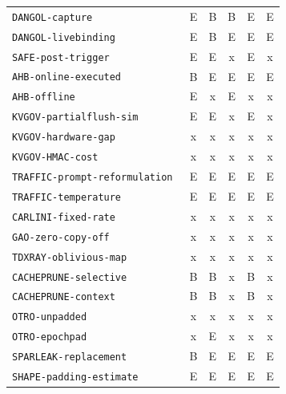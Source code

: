 \begin{table}[t]
\begin{tabularx}{\textwidth}{@{}Yccccc@{}}
\texttt{DANGOL-\allowbreak{}capture}~\cite{dangol2026workflow} & E & B & B & E & E\\
\texttt{DANGOL-\allowbreak{}livebinding}~\cite{dangol2026workflow} & E & B & E & E & E\\
\texttt{SAFE-\allowbreak{}post-\allowbreak{}trigger}~\cite{chu2025safekv} & E & E & x & E & x\\
\texttt{AHB-\allowbreak{}online-\allowbreak{}executed}~\cite{zhu2026turing} & B & E & E & E & E\\
\texttt{AHB-\allowbreak{}offline}~\cite{zhu2026turing} & E & x & E & x & x\\
\texttt{KVGOV-\allowbreak{}partialflush-\allowbreak{}sim}~\cite{addagada2026kvgov} & E & E & x & E & x\\
\texttt{KVGOV-\allowbreak{}hardware-\allowbreak{}gap}~\cite{addagada2026kvgov} & x & x & x & x & x\\
\texttt{KVGOV-\allowbreak{}HMAC-\allowbreak{}cost}~\cite{addagada2026kvgov} & x & x & x & x & x\\
\texttt{TRAFFIC-\allowbreak{}prompt-\allowbreak{}reformulation}~\cite{pouryousef2026traffic} & E & E & E & E & E\\
\texttt{TRAFFIC-\allowbreak{}temperature}~\cite{pouryousef2026traffic} & E & E & E & E & E\\
\texttt{CARLINI-\allowbreak{}fixed-\allowbreak{}rate}~\cite{carlini2024remote} & x & x & x & x & x\\
\texttt{GAO-\allowbreak{}zero-\allowbreak{}copy-\allowbreak{}off}~\cite{gao2025iknow} & x & x & x & x & x\\
\texttt{TDXRAY-\allowbreak{}oblivious-\allowbreak{}map}~\cite{hornetz2026tdxray} & x & x & x & x & x\\
\texttt{CACHEPRUNE-\allowbreak{}selective}~\cite{wu2026cacheprune} & B & B & x & B & x\\
\texttt{CACHEPRUNE-\allowbreak{}context}~\cite{wu2026cacheprune} & B & B & x & B & x\\
\texttt{OTRO-\allowbreak{}unpadded}~\cite{lee2026otro} & x & x & x & x & x\\
\texttt{OTRO-\allowbreak{}epochpad}~\cite{lee2026otro} & x & E & x & x & x\\
\texttt{SPARLEAK-\allowbreak{}replacement}~\cite{chen2026sparleak} & B & E & E & E & E\\
\texttt{SHAPE-\allowbreak{}padding-\allowbreak{}estimate}~\cite{hadad2026shape} & E & E & E & E & E\\
\bottomrule\end{tabularx}\end{table}
